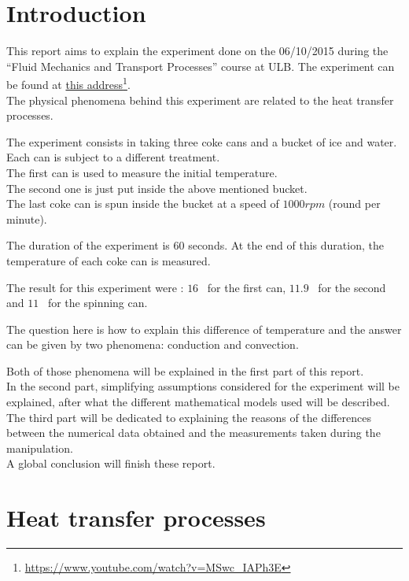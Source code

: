 \documentclass{report}
\begin{document}
	\clearpage
	
	\tableofcontents
	\listoffigures
	
	\chapter{Introduction}\label{intro}
	
	This report aims to explain the experiment done on the 06/10/2015 during the ``Fluid Mechanics and Transport Processes'' course at ULB. The experiment can be found at \hyperref{https://www.youtube.com/watch?v=MSwc_IAPh3E}{}{}{this address}\footnote{\url{https://www.youtube.com/watch?v=MSwc_IAPh3E}}.\\
	The physical phenomena behind this experiment are related to the heat transfer processes.

	The experiment consists in taking three coke cans and a bucket of ice and water. Each can is subject to a different treatment.\\
	The first can is used to measure the initial temperature.\\
	The second one is just put inside the above mentioned bucket.\\
	The last coke can is spun inside the bucket at a speed of $1000rpm$ (round per minute).
	
	The duration of the experiment is $60$ seconds.	At the end of this duration, the temperature of each coke can is measured. 
	
	The result for this experiment were : $16$ \textcelsius\ for the first can, $11.9$ \textcelsius\ for the second and $11$ \textcelsius\ for the spinning can.
	
	The question here is how to explain this difference of temperature and the answer can be given by two phenomena: conduction and convection.

	Both of those phenomena will be explained in the first part of this report.\\
	In the second part, simplifying assumptions considered for the experiment will be explained, after what the different mathematical models used will be described.\\
	The third part will be dedicated to explaining the reasons of the differences between the numerical data obtained and the measurements taken during the manipulation.\\
	A global conclusion will finish these report.
	
	\chapter{Heat transfer processes}\label{htp}
	
\end{document}

